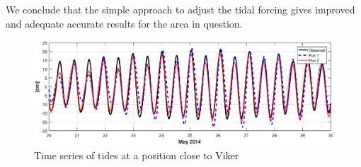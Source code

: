 We conclude that the simple approach to adjust the tidal forcing gives improved and adequate accurate results for the area in question. 



\begin{figure}[!t]
\centering
\includegraphics[width=\textwidth]{fig_Viker_timeseries}
\caption{Time series of tides at a position close to Viker}
\label{fig:Viker_timeseries}
\end{figure}



